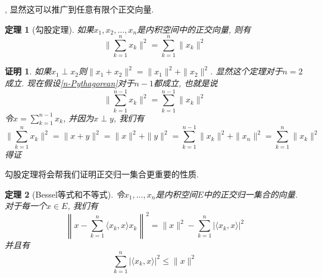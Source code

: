 \documentclass[a4paper,11pt]{article}
\theoremstyle{mystyle}
\newtheorem{theorem}{\hspace{2em}定理}[section]
\newtheorem{Proof}{\hspace{2em}证明}[section]
\begin{document}
, 显然这可以推广到任意有限个正交向量.
\begin{theorem}[勾股定理]
  如果$x_1,x_2,\dots,x_n$是内积空间中的正交向量, 则有
  \begin{equation*}\label{n-Pythagorean}
    \|\sum_{k=1}^{n}x_k\|^2=\sum_{k=1}^{n}\|x_k\|^2
  \end{equation*}
\end{theorem}
\begin{Proof}
  如果$x_1\perp x_2$则$\|x_1+x_2\|^2=\|x_1\|^2+\|x_2\|^2$. 显然这个定理对于$n=2$成立. 现在假设\eqref{n-Pythagorean}对于$n-1$都成立, 也就是说
  \begin{equation*}
    \|\sum_{k=1}^{n-1}x_k\|^2=\sum_{k=1}^{n-1}\|x_k\|^2
  \end{equation*}
  令$x=\sum_{k=1}^{n-1}x_k$, 并因为$x\perp y$, 我们有
  \begin{equation*}
    \|\sum_{k=1}^{n}x_k\|^2=\|x+y\|^2=\|x\|^2+\|y\|^2=\sum_{k=1}^{n-1}\|x_k\|^2+\|x_n\|^2=\sum_{k=1}^{n}\|x_k\|^2
  \end{equation*}
  得证
\end{Proof}
勾股定理将会帮我们证明正交归一集合更重要的性质.
\begin{theorem}[Bessel等式和不等式]
  令$x_1,\dots,x_n$是内积空间$E$中的正交归一集合的向量. 对于每一个$x\in E$, 我们有
  \begin{equation}\label{Bessel neq}
    \left\|x-\sum_{k=1}^{n}\langle x_k,x\rangle x_k\right\|^2=\|x\|^2-\sum_{k=1}^{n}|\langle x_k,x\rangle|^2
  \end{equation}
  并且有
  \begin{equation*}
    \sum_{k=1}^{n}|\langle x_k,x\rangle|^2\leq\|x\|^2
  \end{equation*}
\end{theorem}
\end{document}
